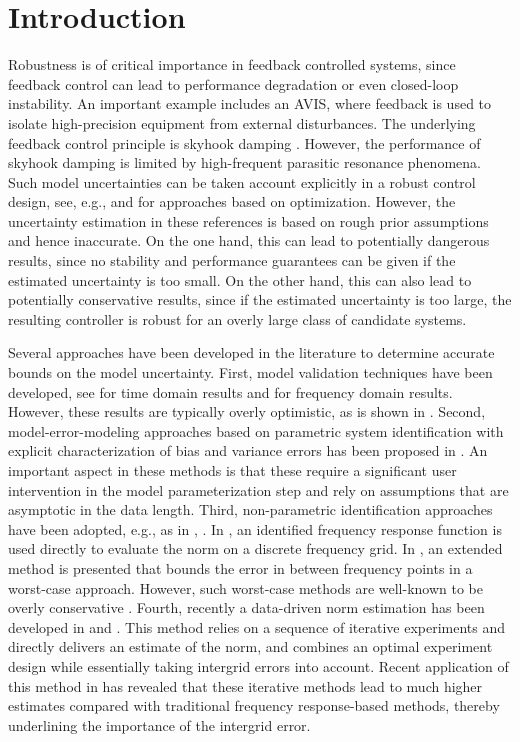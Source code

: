 \section{Introduction}
\label{sec:Intro}

Robustness is of critical importance in feedback controlled systems, since feedback control can lead to performance degradation or even closed-loop instability. 
An important example includes an \gls{AVIS}, where feedback is used to isolate high-precision equipment from external disturbances. 
The underlying feedback control principle is skyhook damping \citep{Karnopp1995}. However, the performance of skyhook damping is limited by high-frequent parasitic resonance phenomena. 
Such model uncertainties can be taken account explicitly in a robust control design, see, e.g., \citet{Zhang2005HybridAvis} and \citet{Chida2008} for approaches based on \Hinf{} optimization. 
However, the uncertainty estimation in these references is based on rough prior assumptions and hence inaccurate. 
On the one hand, this can lead to potentially dangerous results, since no stability and performance guarantees can be given if the estimated uncertainty is too small. 
On the other hand, this can also lead to potentially conservative results, since if the estimated uncertainty is too large, the resulting controller is robust for an overly large class of candidate systems.

Several approaches have been developed in the literature to determine accurate bounds on the model uncertainty. First, model validation techniques have been developed, see \cite{Poolla1994} for time domain results and \cite{Smith1992} for frequency domain results. 
However, these results are typically overly optimistic, as is shown in \cite{Oomen2009UncEstim}. 
Second, model-error-modeling approaches based on parametric system identification with explicit characterization of bias and variance errors has been proposed in \cite{Ljung1999MEM}. 
An important aspect in these methods is that these require a significant user intervention in the model parameterization step and rely on assumptions that are asymptotic in the data length. 
Third, non-parametric identification approaches have been adopted, e.g., as in , . 
In , an identified frequency response function is used directly to evaluate the \Hinf{} norm on a discrete frequency grid. In , an extended method is presented that bounds the error in between frequency points in a worst-case approach. 
However, such worst-case methods are well-known to be overly conservative \cite[Section 9.5.2]{Vinnicombe2001}. Fourth, recently a data-driven \Hinf{} norm estimation has been developed in \cite{Wahlberg2010} and \cite{Oomen2014ILH}. 
This method relies on a sequence of iterative experiments and directly delivers an estimate of the \Hinf{} norm, and combines an optimal experiment design while essentially taking intergrid errors into account.
Recent application of this method in \cite{Oomen2014ILH} has revealed that these iterative methods lead to much higher \Hinf{} estimates compared with traditional frequency response-based methods, thereby underlining the importance of the intergrid error.

